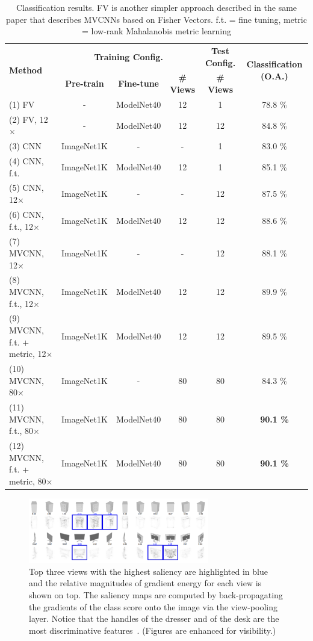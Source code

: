 \begin{table}
\centering
\caption{Classification results. FV is another simpler approach described in the same paper
that describes MVCNNs \cite{multi_view} based on Fisher Vectors. f.t. = fine tuning, metric = low-rank Mahalanobis metric learning}
\begin{tabular}{l|ccc|c|c}
\toprule
\multirow{2}{*}{\textbf{Method}} &
\multicolumn{3}{c|}{\textbf{Training Config.}} & \textbf{Test Config.} & \multirow{2}{*}{\textbf{Classification (O.A.)}} \\
 & \textbf{Pre-train} & \textbf{Fine-tune} & \textbf{\# Views} & \textbf{\# Views} & \\    
\midrule
\midrule
(1) FV & - & ModelNet40 & 12 & 1 & 78.8 \% \\
(2) FV, 12$\times$ & - & ModelNet40 & 12 & 12 & 84.8 \% \\
(3) CNN & ImageNet1K & - & - & 1 & 83.0 \% \\
(4) CNN, f.t. & ImageNet1K & ModelNet40 & 12 & 1 & 85.1 \% \\
(5) CNN, 12$\times$ & ImageNet1K & - & - & 12 & 87.5 \% \\
(6) CNN, f.t., 12$\times$ & ImageNet1K & ModelNet40 & 12 & 12 & 88.6 \% \\
\hline
(7) MVCNN, 12$\times$ & ImageNet1K & - & - & 12 & 88.1 \% \\
(8) MVCNN, f.t., 12$\times$ & ImageNet1K & ModelNet40 & 12 & 12 & 89.9 \% \\
(9) MVCNN, f.t. $+$ metric, 12$\times$ & ImageNet1K & ModelNet40 & 12 & 12 & 89.5 \% \\
(10) MVCNN, 80$\times$ & ImageNet1K & - & 80 & 80 & 84.3 \% \\
(11) MVCNN, f.t., 80$\times$ & ImageNet1K & ModelNet40 & 80 & 80 & \textbf{90.1 \%} \\
(12) MVCNN, f.t. + metric, 80$\times$ & ImageNet1K & ModelNet40 & 80 & 80 & \textbf{90.1 \%} \\
\bottomrule
\end{tabular}
\label{tab:MVCNN_results_table}
\end{table}

\begin{figure}[ht]
    \centering
    \captionsetup{width=.95\linewidth}
    \includegraphics[width=0.7\textwidth]{images/MVCNN_saliency.png}
    \caption{Top three views with the highest saliency are highlighted in blue and the relative magnitudes of gradient energy for each view is
shown on top. The saliency maps are computed by back-propagating the gradients of the class score onto the image via the view-pooling
layer. Notice that the handles of the dresser and of the desk are the most discriminative features~\cite{multi_view}. (Figures are enhanced for visibility.)}
    \label{fig:MVCNN_saliency}
\end{figure}

